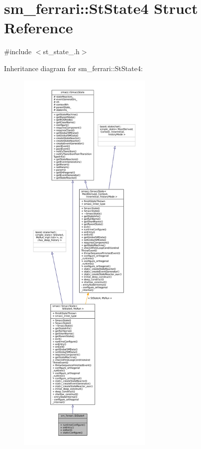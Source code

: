 \hypertarget{structsm__ferrari_1_1StState4}{}\section{sm\+\_\+ferrari\+:\+:St\+State4 Struct Reference}
\label{structsm__ferrari_1_1StState4}


{\ttfamily \#include $<$st\+\_\+state\+\_.\+h$>$}



Inheritance diagram for sm\+\_\+ferrari\+:\+:St\+State4\+:
\nopagebreak
\begin{figure}[H]
\begin{center}
\leavevmode
\includegraphics[height=550pt]{structsm__ferrari_1_1StState4__inherit__graph}
\end{center}
\end{figure}



